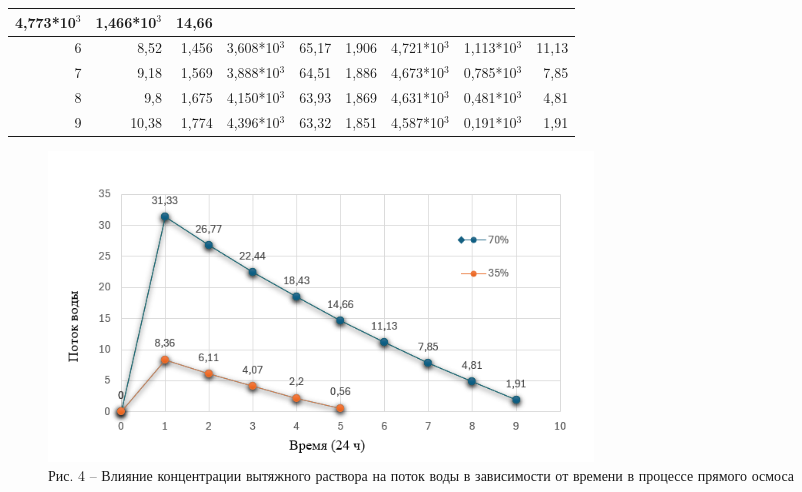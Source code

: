 \begin{table}[H]
{\begin{tabular}{|r|rrl|rrl|l|r|}
  4,773*10$^3$ &
  1,466*10$^3$ &
  14,66 \\ \hline
6 &
  \multicolumn{1}{r|}{8,52} &
  \multicolumn{1}{r|}{1,456} &
  3,608*10$^3$ &
  \multicolumn{1}{r|}{65,17} &
  \multicolumn{1}{r|}{1,906} &
  4,721*10$^3$ &
  1,113*10$^3$ &
  11,13 \\ \hline
7 &
  \multicolumn{1}{r|}{9,18} &
  \multicolumn{1}{r|}{1,569} &
  3,888*10$^3$ &
  \multicolumn{1}{r|}{64,51} &
  \multicolumn{1}{r|}{1,886} &
  4,673*10$^3$ &
  0,785*10$^3$ &
  7,85 \\ \hline
8 &
  \multicolumn{1}{r|}{9,8} &
  \multicolumn{1}{r|}{1,675} &
  4,150*10$^3$ &
  \multicolumn{1}{r|}{63,93} &
  \multicolumn{1}{r|}{1,869} &
  4,631*10$^3$ &
  0,481*10$^3$ &
  4,81 \\ \hline
9 &
  \multicolumn{1}{r|}{10,38} &
  \multicolumn{1}{r|}{1,774} &
  4,396*10$^3$ &
  \multicolumn{1}{r|}{63,32} &
  \multicolumn{1}{r|}{1,851} &
  4,587*10$^3$ &
  0,191*10$^3$ &
  1,91 \\ \hline
\end{tabular}%
}
\end{table}

\begin{figure}[H]
	\centering
	\includegraphics[width=0.7\textwidth]{media/chem/image28}
	\caption*{Рис. 4 -- Влияние концентрации вытяжного раствора на поток воды
в зависимости от времени в процессе прямого осмоса}
\end{figure}

